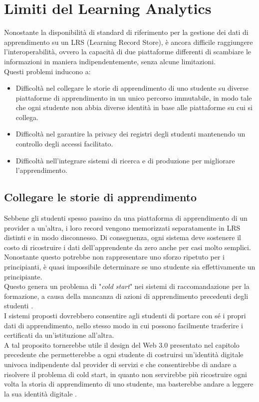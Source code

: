 \section{Limiti del Learning Analytics}
Nonostante la disponibilità di standard di riferimento per la gestione dei dati di apprendimento su un LRS (Learning Record Store), è ancora difficile raggiungere l'interoperabilità,
ovvero la capacità di due piattaforme differenti di scambiare le informazioni in maniera indipendentemente, senza alcune limitazioni.
\\Questi problemi inducono a:
\begin{itemize}
    \item Difficoltà nel collegare le storie di apprendimento di uno studente su diverse piattaforme di apprendimento in un unico percorso immutabile, in modo tale che ogni studente non abbia diverse identità in base alle piattaforme su cui si collega.
    \item Difficoltà nel garantire la privacy dei registri degli studenti mantenendo un controllo degli accessi facilitato.
    \item Difficoltà nell'integrare sistemi di ricerca e di produzione per migliorare l'apprendimento.
\end{itemize}

\subsection{Collegare le storie di apprendimento }
Sebbene gli studenti spesso passino da una piattaforma di apprendimento di un provider a un'altra, i loro record vengono memorizzati separatamente in LRS distinti e in modo disconnesso. 
Di conseguenza, ogni sistema deve sostenere il costo di ricostruire i dati dell'apprendente da zero anche per casi molto semplici. Nonostante questo potrebbe non rappresentare uno sforzo ripetuto per i principianti, è quasi impossibile determinare se uno studente sia effettivamente un principiante.
\\Questo genera un problema di "\textit{cold start}" nei sistemi di raccomandazione per la formazione, a causa della mancanza di azioni di apprendimento precedenti degli studenti \cite{barnes_stamper_2008}.
\\I sistemi proposti dovrebbero consentire agli studenti di portare con sé i propri dati di apprendimento,
nello stesso modo in cui possono facilmente trasferire i certificati da un'istituzione all'altra. 
\\A tal proposito tornerebbe utile il design del Web 3.0 presentato nel capitolo precedente che permetterebbe a ogni studente di costruirsi un'identità digitale univoca indipendente dal provider di servizi e che consentirebbe di
andare a risolvere il problema di cold start, in quanto non servirebbe più ricostruire ogni volta la storia di apprendimento di uno studente, ma basterebbe andare a leggere la sua identità digitale \cite{ocheja2018connecting}.


